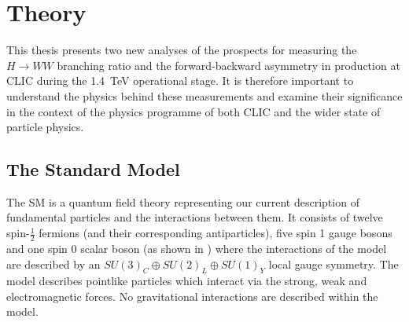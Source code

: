 \chapter{Theory}
\label{theory}

This thesis presents two new analyses of the prospects for measuring the $H\rightarrow WW$ branching ratio and the forward-backward asymmetry in \ttbar production at CLIC during the 1.4~TeV operational stage. It is therefore important to understand the physics behind these measurements and examine their significance in the context of the physics programme of both CLIC and the wider state of particle physics.


\section{The Standard Model}

The \ac{SM} is a quantum field theory representing our current description of fundamental particles and the interactions between them. It consists of twelve spin-$\frac{1}{2}$ fermions (and their corresponding antiparticles), five spin 1 gauge bosons and one spin 0 scalar boson (as shown in ) where the interactions of the model are described by an $SU(3)_{C}\oplus SU(2)_{L}\oplus SU(1)_{Y}$ local gauge symmetry. The model describes pointlike particles which interact via the strong, weak and electromagnetic forces. No gravitational interactions are described within the model.

